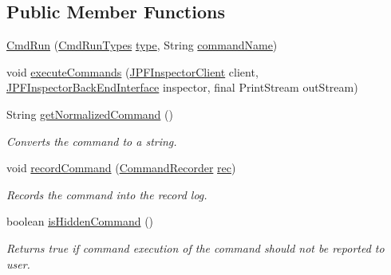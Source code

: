 \subsection*{Public Member Functions}
\begin{DoxyCompactItemize}
\item 
\hyperlink{classgov_1_1nasa_1_1jpf_1_1inspector_1_1client_1_1commands_1_1_cmd_run_a127daa4dd1ea27b67e587fac1d32e5b8}{Cmd\+Run} (\hyperlink{enumgov_1_1nasa_1_1jpf_1_1inspector_1_1client_1_1commands_1_1_cmd_run_1_1_cmd_run_types}{Cmd\+Run\+Types} \hyperlink{classgov_1_1nasa_1_1jpf_1_1inspector_1_1client_1_1commands_1_1_cmd_run_ab15ead52f55e938e9d4b682e1ecbdf0e}{type}, String \hyperlink{classgov_1_1nasa_1_1jpf_1_1inspector_1_1client_1_1commands_1_1_cmd_run_aed9e28e35b63746d9870c89ed0a37ac5}{command\+Name})
\item 
void \hyperlink{classgov_1_1nasa_1_1jpf_1_1inspector_1_1client_1_1commands_1_1_cmd_run_a7f96ec6da05532104edd59ef0f11390f}{execute\+Commands} (\hyperlink{classgov_1_1nasa_1_1jpf_1_1inspector_1_1client_1_1_j_p_f_inspector_client}{J\+P\+F\+Inspector\+Client} client, \hyperlink{interfacegov_1_1nasa_1_1jpf_1_1inspector_1_1interfaces_1_1_j_p_f_inspector_back_end_interface}{J\+P\+F\+Inspector\+Back\+End\+Interface} inspector, final Print\+Stream out\+Stream)
\item 
String \hyperlink{classgov_1_1nasa_1_1jpf_1_1inspector_1_1client_1_1commands_1_1_cmd_run_a497432cefc2d7876ef0214bf9c6cc809}{get\+Normalized\+Command} ()
\begin{DoxyCompactList}\small\item\em Converts the command to a string. \end{DoxyCompactList}\item 
void \hyperlink{classgov_1_1nasa_1_1jpf_1_1inspector_1_1client_1_1_client_command_ae0670332ec750bc5b9016d0b04d8adfe}{record\+Command} (\hyperlink{classgov_1_1nasa_1_1jpf_1_1inspector_1_1client_1_1_command_recorder}{Command\+Recorder} \hyperlink{classgov_1_1nasa_1_1jpf_1_1inspector_1_1client_1_1_client_command_af4246f2427035c72a6af45a2c61361f7}{rec})
\begin{DoxyCompactList}\small\item\em Records the command into the record log. \end{DoxyCompactList}\item 
boolean \hyperlink{classgov_1_1nasa_1_1jpf_1_1inspector_1_1client_1_1_client_command_afb09c400c64e2d8e01059b91ff847761}{is\+Hidden\+Command} ()
\begin{DoxyCompactList}\small\item\em Returns true if command execution of the command should not be reported to user. \end{DoxyCompactList}\item 

\end{DoxyCompactItemize}

